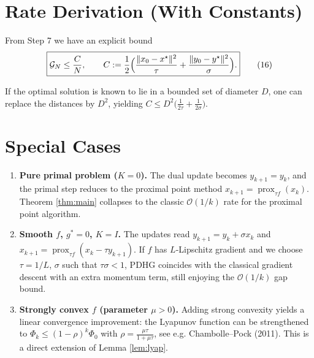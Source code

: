 \documentclass{article}
\newcommand{\prox}{\operatorname{prox}}
\newcommand{\norm}[1]{\|#1\|}
\begin{document}
\section*{Rate Derivation (With Constants)}
From Step 7 we have an explicit bound
\[
\boxed{
\mathcal{G}_{N}
\le
\frac{C}{N},
\qquad
C:=\frac{1}{2}\Bigl(\frac{\norm{x_{0}-x^{\star}}^{2}}{\tau}
+\frac{\norm{y_{0}-y^{\star}}^{2}}{\sigma}\Bigr).
}
\tag{16}
\]

If the optimal solution is known to lie in a bounded set of diameter $D$, one can replace the distances by $D^{2}$, yielding $C\le D^{2}\bigl(\frac{1}{2\tau}+\frac{1}{2\sigma}\bigr)$.

\section*{Special Cases}
\begin{enumerate}
\item \textbf{Pure primal problem ($K=0$).}  
   The dual update becomes $y_{k+1}=y_{k}$, and the primal step reduces to the proximal point method  
   $x_{k+1}= \prox_{\tau f}(x_{k})$.  
   Theorem \ref{thm:main} collapses to the classic $\mathcal{O}(1/k)$ rate for the proximal point algorithm.

\item \textbf{Smooth $f$, $g^{*}=0$, $K=I$.}  
   The updates read $y_{k+1}=y_{k}+\sigma x_{k}$ and $x_{k+1}= \prox_{\tau f}(x_{k}-\tau y_{k+1})$.  
   If $f$ has $L$‑Lipschitz gradient and we choose $\tau=1/L$, $\sigma$ such that $\tau\sigma<1$, PDHG coincides with the classical gradient descent with an extra momentum term, still enjoying the $\mathcal{O}(1/k)$ gap bound.

\item \textbf{Strongly convex $f$ (parameter $\mu>0$).}  
   Adding strong convexity yields a linear convergence improvement: the Lyapunov function can be strengthened to $\Phi_{k}\le (1-\rho)^{k}\Phi_{0}$ with $\rho=\frac{\mu\tau}{1+\mu\tau}$, see e.g. Chambolle–Pock (2011). This is a direct extension of Lemma \ref{lem:lyap}.
\end{enumerate}

\end{document}
